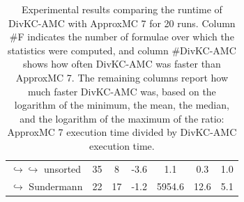 \documentclass{article}
\newcommand\approxmc[0]{ApproxMC\xspace}
\newcommand\divkcamc[0]{DivKC-AMC\xspace}
\begin{document}
\begin{table}[h!]
\begin{tabular}{l|c|c|c|c|c|c}
$\hookrightarrow \hookrightarrow$ unsorted & 35 & 8 &  -3.6 &   1.1 &   0.3 &   1.0 \\
$\hookrightarrow$ Sundermann \cite{SBK+:SPLC24} & 22 & 17 &  -1.2 & 5954.6 &  12.6 &   5.1 \\
            \end{tabular}
                \caption{Experimental results comparing the runtime of \divkcamc with \approxmc7 for 20 runs.
            Column \#F indicates the number of formulae over which the statistics were computed, and column \#\divkcamc shows how often \divkcamc was faster than \approxmc7.
            The remaining columns report how much faster \divkcamc was, based on the logarithm of the minimum, the mean, the median, and the logarithm of the maximum of the ratio: \approxmc7 execution time divided by \divkcamc execution time.
        }
        \label{divkc:tab:appmc:run}
    \end{table}
\end{document}
